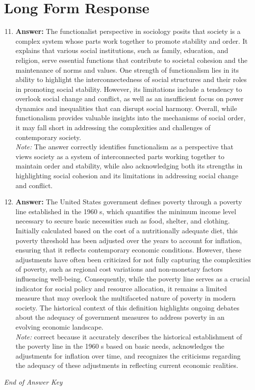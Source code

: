 \documentclass[12pt]{article}
\begin{document}
\section*{Long Form Response}
\begin{enumerate}[label=\arabic*.]
\setcounter{enumi}{10}
\item \textbf{Answer:} The functionalist perspective in sociology posits that society is a complex system whose parts work together to promote stability and order. It explains that various social institutions, such as family, education, and religion, serve essential functions that contribute to societal cohesion and the maintenance of norms and values. One strength of functionalism lies in its ability to highlight the interconnectedness of social structures and their roles in promoting social stability. However, its limitations include a tendency to overlook social change and conflict, as well as an insufficient focus on power dynamics and inequalities that can disrupt social harmony. Overall, while functionalism provides valuable insights into the mechanisms of social order, it may fall short in addressing the complexities and challenges of contemporary society.
\\ \textit{Note:} The answer correctly identifies functionalism as a perspective that views society as a system of interconnected parts working together to maintain order and stability, while also acknowledging both its strengths in highlighting social cohesion and its limitations in addressing social change and conflict.
\item \textbf{Answer:} The United States government defines poverty through a poverty line established in the 1960 s, which quantifies the minimum income level necessary to secure basic necessities such as food, shelter, and clothing. Initially calculated based on the cost of a nutritionally adequate diet, this poverty threshold has been adjusted over the years to account for inflation, ensuring that it reflects contemporary economic conditions. However, these adjustments have often been criticized for not fully capturing the complexities of poverty, such as regional cost variations and non-monetary factors influencing well-being. Consequently, while the poverty line serves as a crucial indicator for social policy and resource allocation, it remains a limited measure that may overlook the multifaceted nature of poverty in modern society. The historical context of this definition highlights ongoing debates about the adequacy of government measures to address poverty in an evolving economic landscape.
\\ \textit{Note:} correct because it accurately describes the historical establishment of the poverty line in the 1960 s based on basic needs, acknowledges the adjustments for inflation over time, and recognizes the criticisms regarding the adequacy of these adjustments in reflecting current economic realities.
\end{enumerate}

\vfill
\noindent\textit{End of Answer Key}
\end{document}
